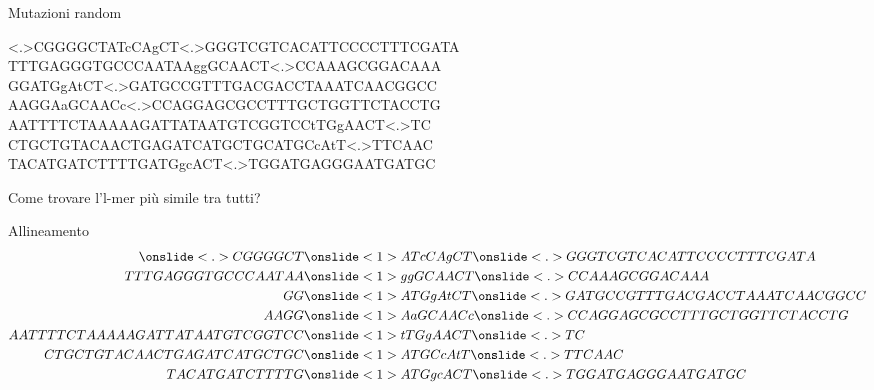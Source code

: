 	\begin{frame}{Mutazioni random}
		\begin{center}						
			\onslide<.>CGGGGCT\onslide<1>ATcCAgCT\onslide<.>GGGTCGTCACATTCCCCTTTCGATA\\
			TTTGAGGGTGCCCAATAA\onslide<1>ggGCAACT\onslide<.>CCAAAGCGGACAAA\\
			GG\onslide<1>ATGgAtCT\onslide<.>GATGCCGTTTGACGACCTAAATCAACGGCC\\
			AAGG\onslide<1>AaGCAACc\onslide<.>CCAGGAGCGCCTTTGCTGGTTCTACCTG\\
			AATTTTCTAAAAAGATTATAATGTCGGTCC\onslide<1>tTGgAACT\onslide<.>TC\\
			CTGCTGTACAACTGAGATCATGCTGC\onslide<1>ATGCcAtT\onslide<.>TTCAAC\\
			TACATGATCTTTTG\onslide<1>ATGgcACT\onslide<.>TGGATGAGGGAATGATGC
		\end{center}
		Come trovare l'l-mer più simile tra tutti?
	\end{frame}
	
	\begin{frame}{Allineamento}\tiny
		\begin{align*}					
			\onslide<.>CGGGGCT&\onslide<1>ATcCAgCT\onslide<.>GGGTCGTCACATTCCCCTTTCGATA\\
			TTTGAGGGTGCCCAATAA&\onslide<1>ggGCAACT\onslide<.>CCAAAGCGGACAAA\\
			GG&\onslide<1>ATGgAtCT\onslide<.>GATGCCGTTTGACGACCTAAATCAACGGCC\\
			AAGG&\onslide<1>AaGCAACc\onslide<.>CCAGGAGCGCCTTTGCTGGTTCTACCTG\\
			AATTTTCTAAAAAGATTATAATGTCGGTCC&\onslide<1>tTGgAACT\onslide<.>TC\\
			CTGCTGTACAACTGAGATCATGCTGC&\onslide<1>ATGCcAtT\onslide<.>TTCAAC\\
			TACATGATCTTTTG&\onslide<1>ATGgcACT\onslide<.>TGGATGAGGGAATGATGC
		\end{align*}
	\end{frame}
	
